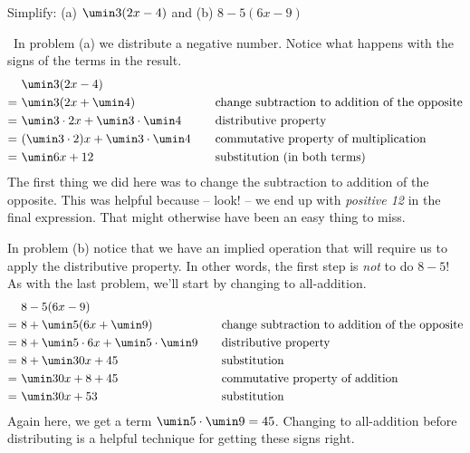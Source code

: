\begin{boxedex}
Simplify: (a) $\umin3(2x - 4)$ \quad and \quad (b) $8-5(6x-9)$

\exsoln\ In problem (a) we distribute a negative number. Notice what happens with the signs of the terms in the result.
\[\begin{aligned}
&~ \umin3(2x - 4)&&\\
=&~ \umin3(2x + \umin4)
&& \quad \text{change subtraction to addition of the opposite}\\
=&~ \umin3 \cdot 2x + \umin3 \cdot \umin4
&& \quad \text{distributive property}\\
=&~ (\umin3 \cdot 2)x + \umin3 \cdot \umin4
&& \quad \text{commutative property of multiplication}\\
=&~ \umin6x + 12
&& \quad \text{substitution (in both terms)}\\
\end{aligned}\]
The first thing we did here was to change the subtraction to addition of the opposite. This was helpful because -- look! -- we end up with \textit{positive 12} in the final expression. That might otherwise have been an easy thing to miss.

In problem (b) notice that we have an implied operation that will require us to apply the distributive property. In other words, the first step is \textit{not} to do $8-5$! As with the last problem, we'll start by changing to all-addition.
\[\begin{aligned}
&~ 8-5(6x-9)&&\\
=&~ 8+\umin5(6x + \umin9)
&& \quad \text{change subtraction to addition of the opposite}\\
=&~ 8 + \umin5\cdot6x + \umin5\cdot\umin9
&& \quad \text{distributive property}\\
=&~ 8 + \umin30x + 45
&& \quad \text{substitution}\\
=&~ \umin30x + 8 + 45
&& \quad \text{commutative property of addition}\\
=&~ \umin30x + 53
&& \quad \text{substitution}\\
\end{aligned}\]
Again here, we get a term $\umin5\cdot\umin9 = 45$. Changing to all-addition before distributing is a helpful technique for getting these signs right.
\end{boxedex}

